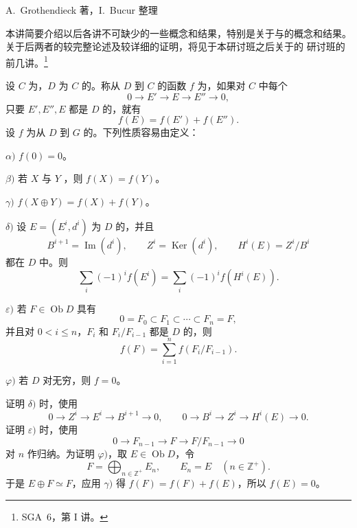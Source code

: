 \begin{center}A.~Grothendieck 著，I.~Bucur 整理\end{center}

本讲简要介绍以后各讲不可缺少的一些概念和结果，特别是关于与的概念和结果。关于后两者的较完整论述及较详细的证明，将见于本研讨班之后关于的 研讨班的前几讲。\footnote{SGA~6，第 I 讲。}

设 $C$ 为，$D$ 为 $C$ 的。称从 $D$ 到 $C$ 的函数 $f$ 为，如果对 $C$ 中每个
\[
0\longrightarrow E'\longrightarrow E\longrightarrow E''\longrightarrow0,
\]
只要 $E',E'',E$ 都是 $D$ 的，就有
\[
f(E)=f(E')+f(E'').
\]
设 $f$ 为从 $D$ 到 $G$ 的。下列性质容易由定义：

$\alpha)$ $f(0)=0$。

$\beta)$ 若 $X$ 与 $Y$ ，则 $f(X)=f(Y)$。

$\gamma)$ $f(X\oplus Y)=f(X)+f(Y)$。

$\delta)$ 设 $E=(E^i,d^i)$ 为 $D$ 的，并且
\[
B^{i+1}=\operatorname{Im}(d^i),\qquad Z^i=\operatorname{Ker}(d^i),\qquad
H^i(E)=Z^i/B^i
\]
都在 $D$ 中。则
\[
\sum_i(-1)^if(E^i)=\sum_i(-1)^if(H^i(E)).
\]

$\varepsilon)$ 若 $F\in\operatorname{Ob}D$ 具有
\[
0=F_0\subset F_1\subset\cdots\subset F_n=F,
\]
并且对 $0<i\leq n$，$F_i$ 和 $F_i/F_{i-1}$ 都是 $D$ 的，则
\[
f(F)=\sum_{i=1}^nf(F_i/F_{i-1}).
\]

$\varphi)$ 若 $D$ 对无穷，则 $f=0$。

证明 $\delta)$ 时，使用
\[
0\longrightarrow Z^i\longrightarrow E^i\longrightarrow B^{i+1}\longrightarrow0,
\qquad
0\longrightarrow B^i\longrightarrow Z^i\longrightarrow H^i(E)\longrightarrow0.
\]
证明 $\varepsilon)$ 时，使用
\[
0\longrightarrow F_{n-1}\longrightarrow F\longrightarrow F/F_{n-1}\longrightarrow0
\]
对 $n$ 作归纳。为证明 $\varphi)$，取 $E\in\operatorname{Ob}D$，令
\[
F=\bigoplus_{n\in\mathbb Z^+}E_n,\qquad E_n=E\quad(n\in\mathbb Z^+).
\]
于是 $E\oplus F\simeq F$，应用 $\gamma)$ 得 $f(F)=f(F)+f(E)$，所以 $f(E)=0$。


